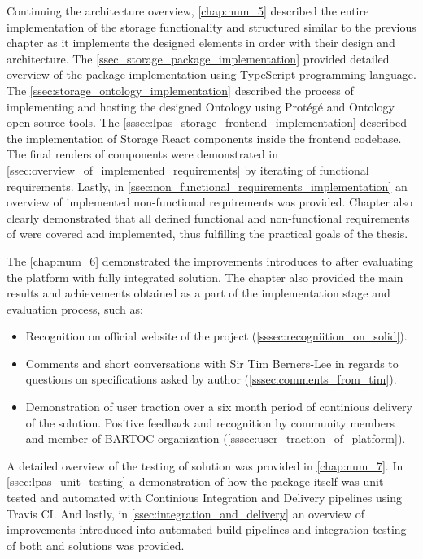 Continuing the architecture overview, \autoref{chap:num_5} described the entire implementation of the storage functionality and structured similar to the previous chapter as it implements the designed elements in order with their design and architecture. The \autoref{ssec_storage_package_implementation} provided detailed overview of the \lpas{} package implementation using TypeScript programming language. The \autoref{ssec:storage_ontology_implementation} described the process of implementing and hosting the designed \lpas{} Ontology using Protégé and Ontology open-source tools. The \autoref{sssec:lpas_storage_frontend_implementation} described the implementation of Storage React components inside the \lpa{} frontend codebase. The final renders of components were demonstrated in \autoref{ssec:overview_of_implemented_requirements} by iterating of functional requirements. Lastly, in \autoref{ssec:non_functional_requirements_implementation} an overview of implemented non-functional requirements was provided. Chapter also clearly demonstrated that all defined functional and non-functional requirements of \lpa{} were covered and implemented, thus fulfilling the practical goals of the thesis.

The \autoref{chap:num_6} demonstrated the improvements introduces to \lpa{} after evaluating the platform with fully integrated \lpas{} solution. The chapter also provided the main results and achievements obtained as a part of the implementation stage and evaluation process, such as:
\begin{itemize}
    \item Recognition on official website of the \solid{} project (\autoref{sssec:recogniition_on_solid}).
    \item Comments and short conversations with Sir Tim Berners-Lee in regards to questions on \solid{} specifications asked by author (\autoref{sssec:comments_from_tim}).
    \item Demonstration of user traction over a six month period of continious delivery of the \lpas{} solution. Positive feedback and recognition by \solid{} community members and member of BARTOC organization (\autoref{sssec:user_traction_of_platform}).  
\end{itemize}
 
A detailed overview of the testing of \lpas{} solution was provided in \autoref{chap:num_7}. In \autoref{ssec:lpas_unit_testing} a demonstration of how the \lpas{} package itself was unit tested and automated with Continious Integration and Delivery pipelines using Travis CI. And lastly, in \autoref{ssec:integration_and_delivery} an overview of improvements introduced into \lpa{} automated build pipelines and integration testing of both \lpa{} and \lpas{} solutions was provided.

